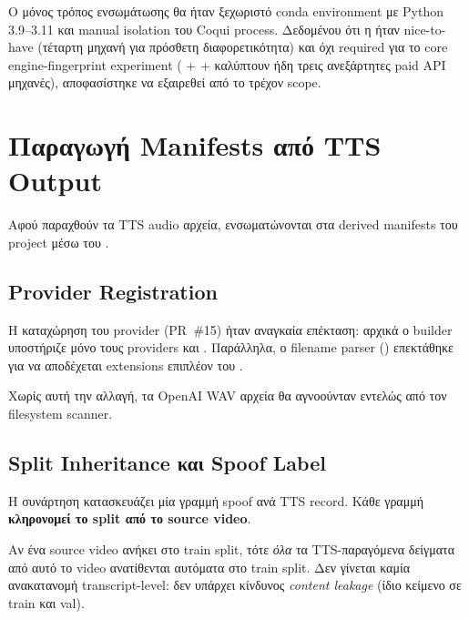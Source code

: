 Ο μόνος τρόπος ενσωμάτωσης θα ήταν ξεχωριστό conda environment
με Python 3.9--3.11 και manual isolation του Coqui process.
Δεδομένου ότι η  ήταν nice-to-have
(τέταρτη μηχανή για πρόσθετη διαφορετικότητα) και όχι required
για το core engine-fingerprint experiment
( +  + 
καλύπτουν ήδη τρεις ανεξάρτητες paid API μηχανές),
αποφασίστηκε να εξαιρεθεί από το τρέχον scope.

\section{Παραγωγή Manifests από TTS Output}
\label{sec:tts-manifests}

Αφού παραχθούν τα TTS audio αρχεία, ενσωματώνονται στα derived manifests
του project μέσω του .

\subsection*{Provider Registration}

Η καταχώρηση του  provider (PR~\#15) ήταν αναγκαία
επέκταση: αρχικά ο builder υποστήριζε μόνο τους providers
 και .
Παράλληλα, ο filename parser () επεκτάθηκε
για να αποδέχεται  extensions επιπλέον του .

Χωρίς αυτή την αλλαγή, τα OpenAI WAV αρχεία θα αγνοούνταν εντελώς
από τον filesystem scanner.

\subsection*{Split Inheritance και Spoof Label}

Η συνάρτηση  κατασκευάζει μία γραμμή
spoof ανά TTS record.
Κάθε γραμμή \textbf{κληρονομεί το split από το source video}.

Αν ένα source video ανήκει στο train split, τότε \emph{όλα} τα
TTS-παραγόμενα δείγματα από αυτό το video ανατίθενται αυτόματα
στο train split.
Δεν γίνεται καμία ανακατανομή transcript-level: δεν υπάρχει
κίνδυνος \emph{content leakage} (ίδιο κείμενο σε train και val).

